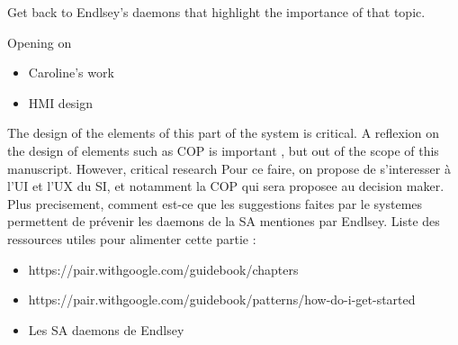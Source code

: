 Get back to Endlsey's daemons that highlight the importance of that topic.

Opening on
\begin{itemize}
    \item Caroline's work
    \item HMI design
\end{itemize}

The design of the elements of this part of the system is critical.
A reflexion on the design of elements such as COP is important , but out of the scope of this manuscript.
However, critical research
Pour ce faire, on propose de s'interesser à l'UI et l'UX du SI, et notamment la COP qui sera proposee au decision maker.
Plus precisement, comment est-ce que les suggestions faites par le systemes permettent de prévenir les daemons de la SA mentiones par Endlsey.
Liste des ressources utiles pour alimenter cette partie :
\begin{itemize}
    \item https://pair.withgoogle.com/guidebook/chapters
    \item https://pair.withgoogle.com/guidebook/patterns/how-do-i-get-started
    \item Les SA daemons de Endlsey
\end{itemize}

